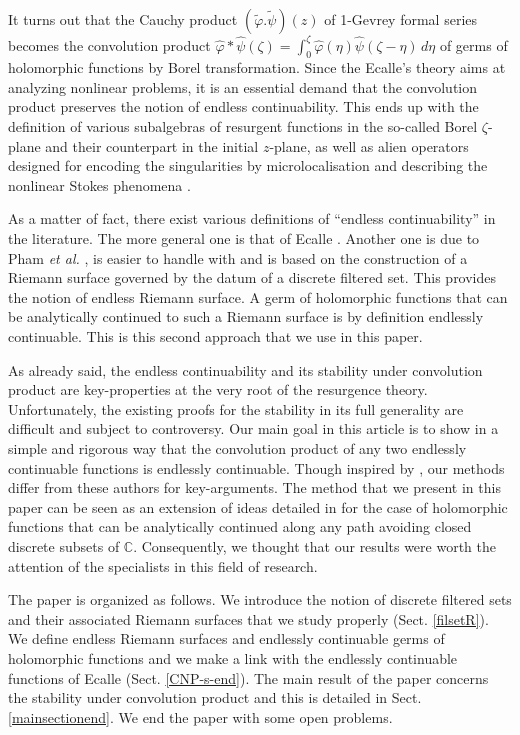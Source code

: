 \documentclass[11pt, english]{smfart}
\theoremstyle{definition}
\begin{document}
It turns out that the Cauchy product
$(\widetilde{\varphi}.\widetilde{\psi})(z)$ 
of 1-Gevrey formal series becomes the convolution
product $\displaystyle \widehat{\varphi} \ast \widehat{\psi}(\zeta)= \int_0^\zeta 
\widehat{\varphi}(\eta) \widehat{\psi}(\zeta-\eta) \, d\eta$
of germs of  holomorphic functions by Borel transformation. Since the Ecalle's theory
aims at analyzing nonlinear problems, it is an essential demand that the convolution
product preserves the notion of endless
continuability. This ends up with the definition of various subalgebras of resurgent
functions in the so-called Borel $\zeta$-plane and their counterpart in the
initial $z$-plane, as well as alien operators designed for encoding
the singularities by microlocalisation and describing the nonlinear
Stokes phenomena \cite{Ec85, Ec93-1, CNP1, S014, Del014}.

As a matter of fact, there exist  various  definitions  of  ``endless
continuability'' in the literature. 
The more general one is that of Ecalle \cite{Ec85,
  Ec93-1}. Another one is due to Pham {\em et al.} \cite{CNP2,
  CNP1}, is  easier to handle with and is based on 
the construction of a Riemann surface governed by the datum of a discrete filtered
set. This provides the notion of endless Riemann surface. A germ 
of holomorphic functions that can be analytically continued to such a
Riemann surface is by definition endlessly continuable. This is this
second approach that we use in this paper.

As already said, the endless continuability  and its stability under  convolution
product are  key-properties at the very root of the
resurgence theory. Unfortunately, the existing proofs for the
stability in its full generality \cite{Ec85, CNP1} are difficult and
subject to controversy.
Our main goal in this article is to show in a simple and rigorous way 
that the convolution product
of any two endlessly continuable functions is endlessly
continuable. Though inspired by \cite{CNP1}, our methods differ from
these authors  for key-arguments. The method that we present in this paper can be seen
as an extension of  ideas
detailed in \cite{OU010, S012, S014} for the case of holomorphic functions 
that can be analytically continued along any path avoiding closed discrete
subsets of $\mathbb{C}$. Consequently, we thought that our results were
worth the attention of the specialists in this field of research.

The paper is organized as follows.
We introduce the notion of discrete filtered
sets and their associated Riemann surfaces that we study properly (Sect. \ref{filsetR}). 
We define endless Riemann surfaces and
endlessly continuable germs of holomorphic functions
 and we make a link with 
the endlessly continuable functions of Ecalle (Sect. \ref{CNP-s-end}).
The main result of the paper concerns the stability under
convolution product and this is detailed in
Sect. \ref{mainsectionend}. We end the paper with some open problems.
\end{document}
